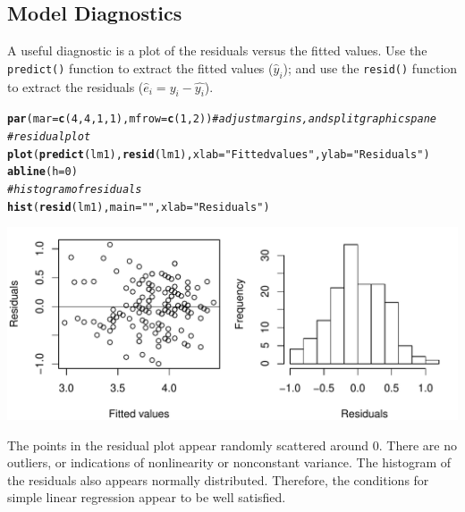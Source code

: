 \documentclass[11pt]{article}\usepackage[]{graphicx}\usepackage[]{color}
\makeatletter
\def\maxwidth{ %
  \ifdim\Gin@nat@width>\linewidth
    \linewidth
  \else
    \Gin@nat@width
  \fi
}
\newcommand{\hlnum}[1]{\textcolor[rgb]{0.686,0.059,0.569}{#1}}%
\newcommand{\hlstr}[1]{\textcolor[rgb]{0.192,0.494,0.8}{#1}}%
\newcommand{\hlcom}[1]{\textcolor[rgb]{0.678,0.584,0.686}{\textit{#1}}}%
\newcommand{\hlstd}[1]{\textcolor[rgb]{0.345,0.345,0.345}{#1}}%
\newcommand{\hlkwc}[1]{\textcolor[rgb]{0.333,0.667,0.333}{#1}}%
\newcommand{\hlkwd}[1]{\textcolor[rgb]{0.737,0.353,0.396}{\textbf{#1}}}%
\newenvironment{kframe}{%
 \def\at@end@of@kframe{}%
 \ifinner\ifhmode%
  \def\at@end@of@kframe{\end{minipage}}%
  \begin{minipage}{\columnwidth}%
 \fi\fi%
 \def\FrameCommand##1{\hskip\@totalleftmargin \hskip-\fboxsep
 \colorbox{shadecolor}{##1}\hskip-\fboxsep
     \hskip-\linewidth \hskip-\@totalleftmargin \hskip\columnwidth}%
 \MakeFramed {\advance\hsize-\width
   \@totalleftmargin\z@ \linewidth\hsize
   \@setminipage}}%
 {\par\unskip\endMakeFramed%
 \at@end@of@kframe}
\newenvironment{knitrout}{}{} %
\makeatother
\begin{document}
\subsection{Model Diagnostics}
A useful diagnostic is a plot of the residuals versus the fitted values.  Use the \texttt{predict()} function to extract the fitted values ($\hat{y}_i$); and use the \texttt{resid()} function to extract the residuals ($\hat{e}_i = y_i - \hat{y_i}$).
\begin{knitrout}
\color{fgcolor}\begin{kframe}
\begin{alltt}
\hlkwd{par}\hlstd{(}\hlkwc{mar}\hlstd{=}\hlkwd{c}\hlstd{(}\hlnum{4}\hlstd{,}\hlnum{4}\hlstd{,}\hlnum{1}\hlstd{,}\hlnum{1}\hlstd{),} \hlkwc{mfrow}\hlstd{=}\hlkwd{c}\hlstd{(}\hlnum{1}\hlstd{,}\hlnum{2}\hlstd{))} \hlcom{# adjust margins, and split graphics pane}
\hlcom{# residual plot}
\hlkwd{plot}\hlstd{(}\hlkwd{predict}\hlstd{(lm1),} \hlkwd{resid}\hlstd{(lm1),} \hlkwc{xlab}\hlstd{=}\hlstr{"Fitted values"}\hlstd{,} \hlkwc{ylab}\hlstd{=}\hlstr{"Residuals"}\hlstd{)}
\hlkwd{abline}\hlstd{(}\hlkwc{h}\hlstd{=}\hlnum{0}\hlstd{)}
\hlcom{# histogram of residuals}
\hlkwd{hist}\hlstd{(}\hlkwd{resid}\hlstd{(lm1),} \hlkwc{main}\hlstd{=}\hlstr{""}\hlstd{,} \hlkwc{xlab}\hlstd{=}\hlstr{"Residuals"}\hlstd{)}
\end{alltt}
\end{kframe}
\includegraphics[width=\maxwidth]{figure/unnamed-chunk-10-1} 

\end{knitrout}

The points in the residual plot appear randomly scattered around 0.  There are no outliers, or indications of nonlinearity or nonconstant variance.  The histogram of the residuals also appears normally distributed.  Therefore, the conditions for simple linear regression appear to be well satisfied.\\
\clearpage
\end{document}
